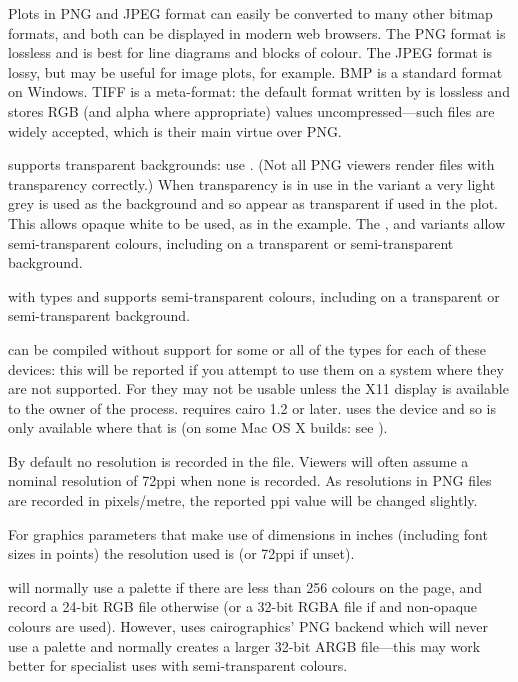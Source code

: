 %
\begin{Details}\relax
Plots in PNG and JPEG format can easily be converted to many other
bitmap formats, and both can be displayed in modern web
browsers.  The PNG format is lossless and is best for line
diagrams and blocks of colour.  The JPEG format is lossy,
but may be useful for image plots, for example.  BMP is a standard
format on Windows.  TIFF is a meta-format: the default format written
by  is lossless and stores RGB (and alpha where
appropriate) values uncompressed---such files are widely accepted,
which is their main virtue over PNG.

 supports transparent backgrounds: use .  (Not all PNG viewers render files with transparency
correctly.)  When transparency is in use in the 
variant a very light grey is used as the background and so appear as
transparent if used in the plot. This allows opaque white to be used,
as in the example.  The ,  and  variants allow
semi-transparent colours, including on a transparent or
semi-transparent background.

 with types  and  supports
semi-transparent colours, including on a transparent or
semi-transparent background.

\R{} can be compiled without support for some or all of the types for
each of these devices: this will be reported if you attempt to use
them on a system where they are not supported.  For  they may not be usable unless the X11 display is available to
the owner of the \R{} process.   requires cairo 1.2
or later.   uses the  device
and so is only available where that is (on some Mac OS X builds: see
).

By default no resolution is recorded in the file.  Viewers will often
assume a nominal resolution of 72ppi when none is recorded.  As
resolutions in PNG files are recorded in pixels/metre, the reported
ppi value will be changed slightly.

For graphics parameters that make use of dimensions in inches
(including font sizes in points) the resolution used is  (or
72ppi if unset).

 will normally use a palette if there are less than 256
colours on the page, and record a 24-bit RGB file otherwise (or a
32-bit RGBA file if  and non-opaque colours are
used).  However,  uses cairographics' PNG
backend which will never use a palette and normally creates a larger
32-bit ARGB file---this may work better for specialist uses with
semi-transparent colours.
\end{Details}
